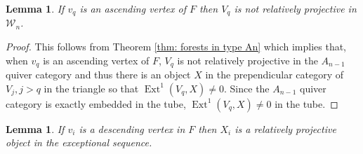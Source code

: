 \documentclass[11pt]{amsart}
\newtheorem{lem}[thm]{Lemma}
\theoremstyle{definition}
\theoremstyle{remark}
\numberwithin{equation}{section}
\DeclareMathOperator{\Ext}{Ext}%
\newcommand{\cW}{\ensuremath{{\mathcal{W}}}}
\begin{document}
\begin{lem}\label{lem: rel proj in tube implies descending}
If $v_q$ is an ascending vertex of $F$ then $V_q$ is not relatively projective in $\cW_n$.
\end{lem}

\begin{proof}
This follows from Theorem \ref{thm: forests in type An} which implies that, when $v_q$ is an ascending vertex of $F$, $V_q$ is not relatively projective in the $A_{n-1}$ quiver category and thus there is an object $X$ in the prependicular category of $V_j,j>q$ in the triangle so that $\Ext^1(V_q,X)\neq0$. Since the $A_{n-1}$ quiver category is exactly embedded in the tube, $\Ext^1(V_q,X)\neq0$ in the tube. 
\end{proof}





\begin{lem}\label{lem: descending vertices are relatively projective}
If $v_i$ is a descending vertex in $F$ then $X_i$ is a relatively projective object in the exceptional sequence.
\end{lem}
\end{document}
